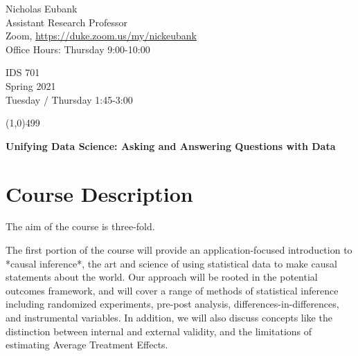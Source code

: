 \documentclass[12pt]{article}
\begin{document}
\singlespacing






\thispagestyle{empty}
\begin{minipage}[t]{.5\textwidth}
	Nicholas Eubank \\
	 Assistant Research Professor\\
	 Zoom, \url{https://duke.zoom.us/my/nickeubank} \\
	 Office Hours: Thursday 9:00-10:00
     \vspace*{0.1cm}
\end{minipage}
\begin{minipage}[t]{.5\textwidth}
	\begin{flushright}  IDS 701 \\
	Spring 2021\\
	Tuesday / Thursday 1:45-3:00 
    \vspace*{0.1cm}
\end{flushright}
\end{minipage}


\line(1,0){499}

\vspace{.35in}

\begin{center}
	\textbf{\LARGE{Unifying Data Science: Asking and Answering Questions with Data} }
\end{center}








\section{Course Description}

The aim of the course is three-fold. 

The first portion of the course will provide an application-focused introduction to *causal inference*, the art and science of using statistical data to make causal statements about the world. Our approach will be rooted in the potential outcomes framework, and will cover a range of methods of statistical inference including randomized experiments, pre-post analysis, differences-in-differences, and instrumental variables. In addition, we will also discuss concepts like the distinction between internal and external validity, and the limitations of estimating Average Treatment Effects. 
\end{document}

